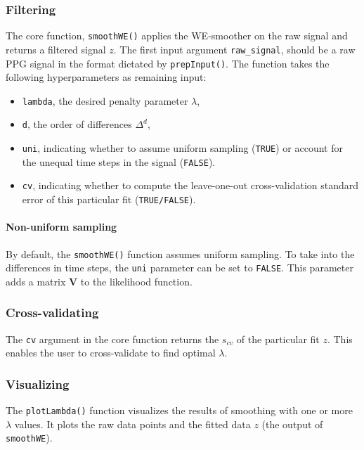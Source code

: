 \documentclass[twocolumn]{bmcart}%
\begin{document}
\subsubsection*{Filtering} 
The core function, \texttt{smoothWE()} applies the WE-smoother on the raw signal and returns a filtered signal $z$.  
The first input argument \verb|raw_signal|, should be a raw PPG signal in the format dictated by \verb|prepInput()|. 
The function takes the following hyperparameters as remaining input: 

\begin{itemize}
\item \verb|lambda|, the desired penalty parameter $\lambda$,

\item \verb|d|, the order of differences $\Delta^d$,

\item \verb|uni|, indicating whether to assume uniform sampling (\verb|TRUE|) or account for the unequal time steps in the signal (\verb|FALSE|). 

\item \verb|cv|, indicating whether to compute the leave-one-out cross-validation standard error of this particular fit (\verb|TRUE/FALSE|).

\end{itemize}

\paragraph{Non-uniform sampling}
By default, the \verb|smoothWE()| function assumes uniform sampling.
To take into the differences in time steps, the \verb|uni| parameter can be set to \verb|FALSE|.
This parameter adds a matrix $\mathbf{V}$ to the likelihood function.

\subsubsection*{Cross-validating}
The \verb|cv| argument in the core function returns the $s_{cv}$ of the particular fit $z$. 
This enables the user to cross-validate to find optimal $\lambda$. 

\subsubsection*{Visualizing}
The \verb|plotLambda()|  function visualizes the results of smoothing with one or more $\lambda$ values. 
It plots the raw data points and the fitted data $z$ (the output of \verb|smoothWE|). 
\end{document}
